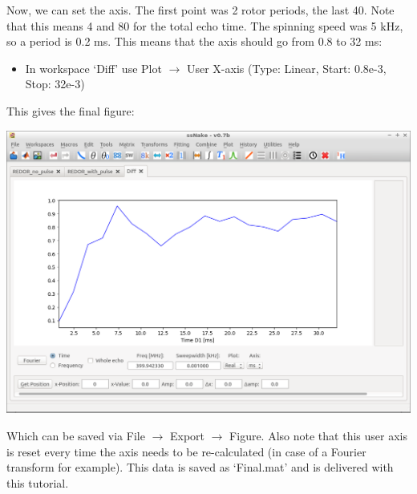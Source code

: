 \documentclass[11pt,a4paper]{article}
\begin{document}
Now, we can set the axis. The first point was 2 rotor periods, the last 40. Note that this means 4
and 80 for the total echo time. The spinning speed was 5 kHz, so a period is 0.2 ms. This means that
the axis should go from 0.8 to 32 ms:
\begin{itemize}
	\item In workspace `Diff' use Plot $\longrightarrow$ User X-axis (Type: Linear, Start: 0.8e-3,
	  Stop: 32e-3)
\end{itemize}
This gives the final figure:
\begin{center}
\includegraphics[width=0.8\linewidth]{Figs/Fig6.png}
\end{center}
Which can be saved via File $\longrightarrow$ Export $\longrightarrow$ Figure. Also note that this
user axis is reset every time the axis needs to be re-calculated (in case of a Fourier transform for
example). This data is saved as `Final.mat' and is delivered with this tutorial.
\end{document}
